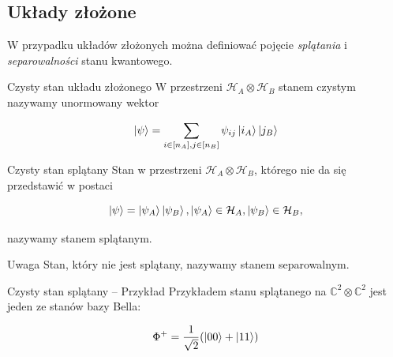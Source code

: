 \documentclass{beamer}
\begin{document}
\subsection{Układy złożone}

\begin{frame}
    \begin{alertblock}{}
        W przypadku układów złożonych można definiować pojęcie \textit{splątania} i \textit{separowalności} stanu kwantowego.
    \end{alertblock}
\end{frame}

\begin{frame}
    \begin{exampleblock}{Czysty stan układu złożonego}
        W przestrzeni $\mathcal{H}_{A} \otimes \mathcal{H}_{B}$ stanem czystym nazywamy unormowany wektor

        $$
            \ket{\psi} = \sum \limits_{i \in [n_{A}], j \in [n_{B}]} \psi_{ij} \ket{i_{A}} \ket{j_{B}}
        $$
    \end{exampleblock}
\end{frame}

\begin{frame}
    \begin{exampleblock}{Czysty stan splątany}
        Stan w przestrzeni $\mathcal{H}_{A} \otimes \mathcal{H}_{B}$, którego nie da się przedstawić w postaci

        $$
            \ket{\psi} = \ket{\psi_{A}} \ket{\psi_{B}}, \ket{\psi_{A}} \in \mathcal{H}_{A}, \ket{\psi_{B}} \in \mathcal{H}_{B},
        $$

        nazywamy stanem splątanym.
    \end{exampleblock}
\end{frame}

\begin{frame}
    \begin{alertblock}{Uwaga}
        Stan, który nie jest splątany, nazywamy stanem separowalnym.
    \end{alertblock}
\end{frame}

\begin{frame}
    \begin{exampleblock}{Czysty stan splątany -- Przykład}
        Przykładem stanu splątanego na $\mathbb{C} ^ {2} \otimes \mathbb{C} ^ {2}$ jest jeden ze stanów bazy Bella:

        $$
            \Phi ^ {+} = \frac{1}{\sqrt{2}} (\ket{00} + \ket{11})
        $$
    \end{exampleblock}
\end{frame}
\end{document}
